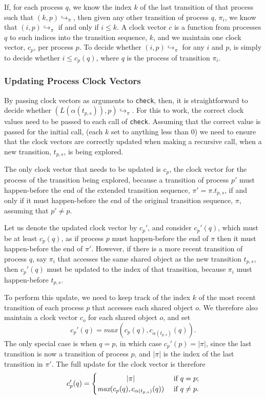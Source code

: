 \documentclass[12pt,a4paper,twoside,openright]{report}
\begin{document}
If, for each process
$q$, we know the index $k$ of the last transition of that
process such that $(k, p)\!\hookrightarrow_\pi$,
then given any other transition of
process $q$, $\pi_i$, we know that
$(i, p)\!\hookrightarrow_\pi$ if and only if
$i \leq k$. A clock vector $c$ is
a function from processes $q$ to such
indices into the transition sequence, $k$,
and we maintain one clock vector, $c_p$, per
process $p$. To decide whether
$(i, p)\!\hookrightarrow_\pi$ for
any $i$ and $p$, is simply to decide
whether $i \leq c_p(q)$, where $q$ is
the process of transition $\pi_i$.

\subsubsection{Updating Process Clock Vectors}
By passing clock vectors as arguments to
\texttt{check}, then, it is straightforward
to decide whether
$(L(\alpha(t_{p,s})), p)\!\hookrightarrow_\pi$.
For this to work, the correct clock values need
to be passed to each call of \texttt{check}.
Assuming that the correct value is passed for
the initial call,
(each $k$ set to anything less than 0)
we need to ensure that the
clock vectors are correctly updated when
making a recursive call, when a new
transition, $t_{p,s}$, is being explored.

The only clock vector that needs to be updated
is $c_p$, the clock vector for the process
of the transition being explored, because
a transition of process $p'$ must happen-before
the end of the extended transition
sequence, $\pi' = \pi.t_{p,s}$, if and
only if it must happen-before the end
of the original transition sequence,
$\pi$, assuming that $p' \neq p$.

Let us denote the updated clock vector
by $c_p'$, and consider $c_p'(q)$, which
must be at least $c_p(q)$, as if process
$p$ must happen-before the end of $\pi$
then it must happen-before the end of $\pi'$.
However, if there is a more recent transition
of process $q$, say $\pi_i$
that accesses the same shared
object as the new transition $t_{p,s}$, then
$c_p'(q)$ must be updated to the index of
that transition, because $\pi_i$ must
happen-before $t_{p,s}$.

To perform this update, we need to keep
track of the index $k$ of the most recent
transition of each process $p$ that
accesses each shared object $o$. We therefore
also maintain a clock vector $c_o$ for each
shared object $o$, and set
\[ c_p'(q) =\textit{max}(c_p(q),
		c_{\alpha(t_{p,s})}(q)).\]
The only special case is when $q = p$,
in which case $c_p'(p) = |\pi|$, since
the last transition is now a transition of
process $p$, and $|\pi|$ is the index
of the last transition in $\pi'$. The
full update for the clock vector is therefore
\[ c_p'(q) =
\begin{cases}
	\hfill |\pi| \hfill & \text{ if } q = p; \\
	\hfill \textit{max}(c_p(q),
		c_{\alpha(t_{p,s})}(q))
		\hfill & \text{ if } q \neq p.
\end{cases}\]
\end{document}
